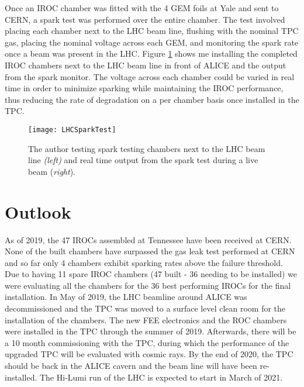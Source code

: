 Once an IROC chamber was fitted with the 4 GEM foils at Yale and sent to CERN, a spark test was performed over the entire chamber.  The test involved placing each chamber next to the LHC beam line, flushing with the nominal TPC gas, placing the nominal voltage across each GEM, and monitoring the spark rate once a beam was present in the LHC.   Figure \ref{fig:LHCspark} shows me installing the completed IROC chambers next to the LHC beam line in front of ALICE and the output from the spark monitor.  The voltage across each chamber could be varied in real time in order to minimize sparking while maintaining the IROC performance, thus reducing the rate of degradation on a per chamber basis once installed in the TPC.




\begin{figure}[h]
\texttt{[image: LHCSparkTest]}
\centering
\caption{The author testing spark testing chambers next to the LHC beam line \textit{(left)} and real time output from the spark test during a live beam (\textit{right}). }
\label{fig:LHCspark}
\end{figure}





\section{Outlook}

As of 2019, the 47 IROCs assembled at Tennessee have been received at CERN.  None of the built chambers have surpassed the gas leak test performed at CERN and so far only 4 chambers exhibit sparking rates above the failure threshold.  Due to having 11 spare IROC chambers (47 built - 36 needing to be installed) we were evaluating all the chambers for the 36 best performing IROCs for the final installation. In May of 2019, the LHC beamline around ALICE was decommissioned and the TPC was moved to a surface level clean room for the installation of the chambers.  The new FEE electronics and the ROC chambers were installed in the TPC through the summer of 2019.  Afterwards, there will be a 10 month commissioning with the TPC, during which the performance of the upgraded TPC will be evaluated with cosmic rays.  By the end of 2020, the TPC should be back in the ALICE cavern and the beam line will have been re-installed.  The Hi-Lumi run of the LHC is expected to start in March of 2021.





